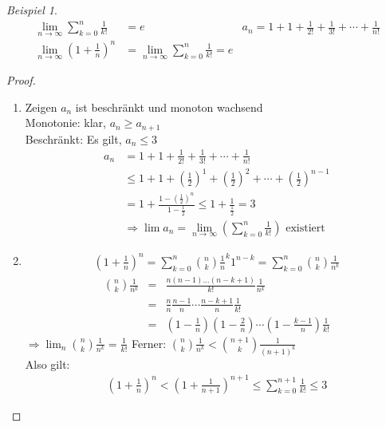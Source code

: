 \documentclass[ngerman,titlepage,twoside, parskip=half*]{scrreprt}
\theoremstyle{plain}
\theoremstyle{definition}
\theoremstyle{remark}
\newtheorem*{beispiel}{Beispiel}
\begin{document}
\begin{beispiel}
\begin{align*}
  \lim_{n \rightarrow \infty} \sum_{k=0}^n \frac{1}{k!} &= e & a_n=
  1+1+\frac{1}{2!}+\frac{1}{3!}+\cdots + \frac{1}{n!}\\
  \lim_{n \rightarrow \infty} \left(1+\frac{1}{n}\right)^n &= \lim_{n \rightarrow
    \infty} \sum_{k=0}^n \frac{1}{k!}=e
\end{align*}
\end{beispiel}
\begin{proof}
\begin{enumerate}
  \item Zeigen $a_n$ ist beschränkt und monoton wachsend\\
    Monotonie: klar, $a_n \geq a_{n+1}$\\
    Beschränkt: Es gilt, $a_n \leq 3$
    \begin{align*}
      a_n& = 1+1+\frac{1}{2!}+\frac{1}{3!}+\cdots + \frac{1}{n!}\\
      & \leq 1+ 1+ \left(\frac{1}{2}\right)^1
      +\left(\frac{1}{2}\right)^2 +\cdots + \left( \frac{1}{2} \right)^{n-1}\\
      & = 1+ \frac{1-\left(\frac{1}{2}\right)^n}{1-\frac{1}{2}} \leq
      1+\frac{1}{\frac{1}{2}} = 3\\
      &\Rightarrow \lim a_n = \lim_{n \rightarrow \infty}
      \left(\sum_{k=0}^n \frac{1}{k!}\right) \text{ existiert}
  \end{align*}
  \item \begin{gather*}\left(1+\frac{1}{n}\right)^n = \sum_{k=0}^n \binom{n}{k}\frac{1}{n}^k
    1^{n-k} = \sum_{k=0}^n \binom{n}{k} \frac{1}{n^k}\end{gather*}
    \begin{align*}
    \binom{n}{k} \frac{1}{n^k} & = & \frac{n(n-1)\ldots(n-k+1)}{k!}\frac{1}{n^k}\\
    & = & \frac{n}{n} \frac{n-1}{n} \cdots \frac{n-k+1}{n} \frac{1}{k!}\\
    & = & \left(1-\frac{1}{n}\right)\left(1-\frac{2}{n}\right) \cdots \left(1-
    \frac{k-1}{n}\right) \frac{1}{k!}
    \end{align*}
    $\Rightarrow \lim_n \binom{n}{k} \frac{1}{n^k}=\frac{1}{k!}$ Ferner:
    $\binom{n}{k} \frac{1}{n^k} < \binom{n+1}{k} \frac{1}{(n+1)^k}$\\
    Also gilt: \begin{gather*}\left(1+\frac{1}{n}\right)^n<\left(1+\frac{1}{n+1}\right)^{n+1}
    \leq \sum_{k=0}^{n+1} \frac{1}{k!} \leq 3\end{gather*}

\end{enumerate}
\end{proof}
\end{document}
